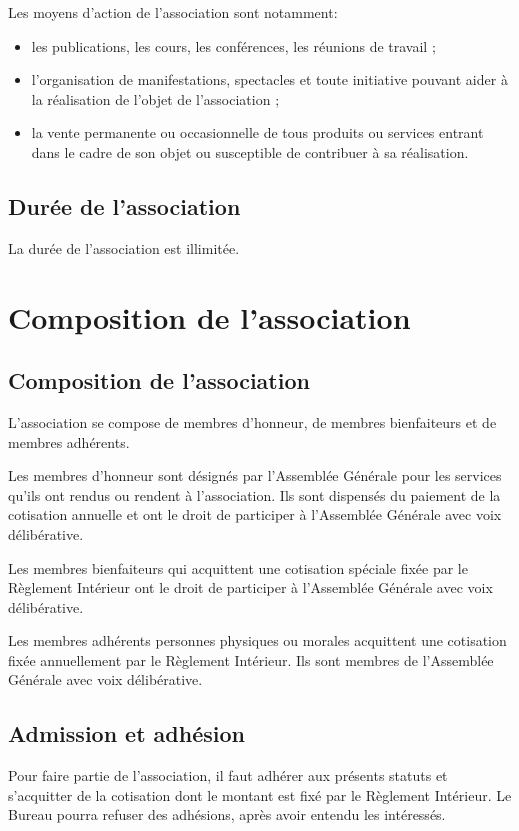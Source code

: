 \documentclass[a4paper,french,10pt]{article}
\begin{document}
Les moyens d’action de l’association sont notamment:
\begin{itemize}
\item les publications, les cours, les conférences, les réunions de
travail ;
\item l’organisation de manifestations, spectacles et toute initiative
pouvant aider à la réalisation de l’objet de l’association ;
\item la vente permanente ou occasionnelle de tous produits ou
services entrant dans le cadre de son objet ou susceptible de
contribuer à sa réalisation.
\end{itemize}

\subsection{Durée de l’association}
\label{sec:duree}
La durée de l’association est illimitée.

\section{Composition de l’association}

\subsection{Composition de l’association}
\label{sec:composition}
L’association se compose de membres d'honneur, de membres bienfaiteurs
et de membres adhérents.

Les membres d'honneur sont désignés par l'Assemblée Générale pour les
services qu'ils ont rendus ou rendent à l'association. Ils sont
dispensés du paiement de la cotisation annuelle et ont le droit de
participer à l'Assemblée Générale avec voix délibérative.

Les membres bienfaiteurs qui acquittent une cotisation spéciale fixée
par le Règlement Intérieur ont le droit de participer à l'Assemblée
Générale avec voix délibérative.

Les membres adhérents personnes physiques ou morales acquittent une
cotisation fixée annuellement par le Règlement Intérieur. Ils sont
membres de l'Assemblée Générale avec voix délibérative.

\subsection{Admission et adhésion}
\label{sec:admission}
Pour faire partie de l’association, il faut adhérer aux présents
statuts et s’acquitter de la cotisation dont le montant est fixé par
le Règlement Intérieur. Le Bureau pourra refuser des adhésions, après
avoir entendu les intéressés.
\end{document}
